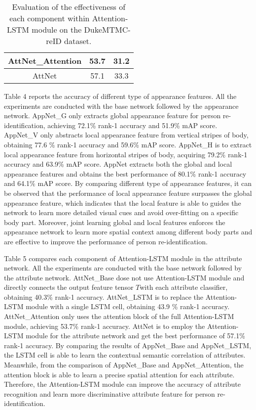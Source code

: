 \documentclass[sigconf]{acmart}
\begin{document}
\begin{table}[htbp]
\begin{center}
\begin{tabular}{|c|c|c|}
			\hline
			AttNet\_Attention&53.7&31.2\\
			\hline
			AttNet&57.1&33.3\\
			\hline
		\end{tabular}
	\end{center}
	\caption{Evaluation of the effectiveness of each component within Attention-LSTM module on the DukeMTMC-reID dataset.}
\end{table}Table 4 reports the accuracy of different type of appearance features. All the experiments are conducted with the base network followed by the appearance network. AppNet\_G only extracts global appearance feature for person re-identification, achieving 72.1\% rank-1 accuracy and 51.9\% mAP score. AppNet\_V only abstracts local appearance feature from vertical stripes of body, obtaining 77.6 \% rank-1 accuracy and 59.6\% mAP score. AppNet\_H is to extract local appearance feature from horizontal stripes of body, acquiring 79.2\% rank-1 accuracy and 63.9\% mAP score. AppNet extracts both the global and local appearance features and obtains the best performance of 80.1\% rank-1 accuracy and 64.1\% mAP score. By comparing different type of appearance features, it can be observed that the performance of local appearance feature surpasses the global appearance feature, which indicates that the local feature is able to guides the network to learn more detailed visual cues and avoid over-fitting on a specific body part. Moreover, joint learning global and local features enforces the appearance network to learn more spatial context among different body parts and are effective to improve the performance of person re-identification.

Table 5 compares each component of Attention-LSTM module in the attribute network. All the experiments are conducted with the base network followed by the attribute network. AttNet\_Base dose not use Attention-LSTM module and directly connects the output feature tensor \boldmath$T$\unboldmath with each attribute classifier, obtaining 40.3\% rank-1 accuracy. AttNet\_LSTM is to replace the Attention-LSTM module with a single LSTM cell, obtaining 43.9 \% rank-1 accuracy. AttNet\_Attention only uses the attention block of the full Attention-LSTM module, achieving 53.7\% rank-1 accuracy. AttNet is to employ the Attention-LSTM module for the attribute network and get the best performance of 57.1\% rank-1 accuracy. By comparing the results of AppNet\_Base and AppNet\_LSTM, the LSTM cell is able to learn the contextual semantic correlation of attributes. Meanwhile, from the comparison of AppNet\_Base and AppNet\_Attention, the attention block is able to learn a precise spatial attention for each attribute. Therefore, the Attention-LSTM module can improve the accuracy of attribute recognition and learn more discriminative attribute feature for person re-identification.
\end{document}

